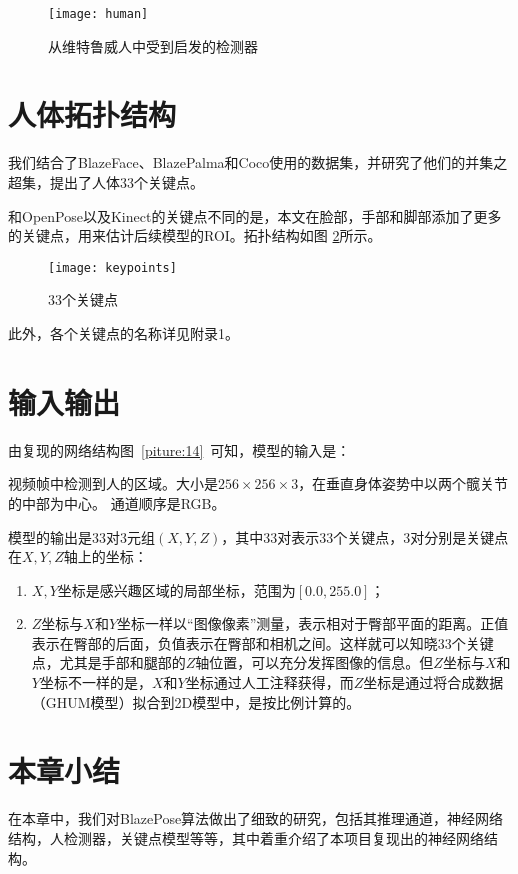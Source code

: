 \begin{figure}[htbp]
\centering
\texttt{[image: human]}
\caption{从维特鲁威人中受到启发的检测器}
\label{piture:15}
\end{figure}

\section{人体拓扑结构}
我们结合了BlazeFace、BlazePalma和Coco使用的数据集，并研究了他们的并集之超集，提出了人体33个关键点。

和OpenPose\cite{8765346}以及Kinect\cite{zhang2012microsoft}的关键点不同的是，本文在脸部，手部和脚部添加了更多的关键点，用来估计后续模型的ROI。拓扑结构如图 \ref{piture:16}所示。

\begin{figure}
\centering
\texttt{[image: keypoints]}
\caption{33个关键点}
\label{piture:16}
\end{figure}

此外，各个关键点的名称详见附录1。

\section{输入输出}
由复现的网络结构图~\ref{piture:14}~可知，模型的输入是：

视频帧中检测到人的区域。大小是$256\times256\times3$，在垂直身体姿势中以两个髋关节的中部为中心。 通道顺序是RGB。

模型的输出是33对3元组$(X,Y,Z)$，其中33对表示33个关键点，3对分别是关键点在$X,Y,Z$轴上的坐标：

\begin{enumerate}
\item $X,Y$坐标是感兴趣区域的局部坐标，范围为$[0.0,255.0]$；

\item $Z$坐标与$X$和$Y$坐标一样以``图像像素''测量，表示相对于臀部平面的距离。正值表示在臀部的后面，负值表示在臀部和相机之间。这样就可以知晓33个关键点，尤其是手部和腿部的$Z$轴位置，可以充分发挥图像的信息。但$Z$坐标与$X$和$Y$坐标不一样的是，$X$和$Y$坐标通过人工注释获得，而$Z$坐标是通过将合成数据（GHUM模型\cite{xu2020ghum,zanfir2020weakly}）拟合到2D模型中，是按比例计算的。
\end{enumerate}

\section{本章小结}
在本章中，我们对BlazePose算法做出了细致的研究，包括其推理通道，神经网络结构，人检测器，关键点模型等等，其中着重介绍了本项目复现出的神经网络结构。

